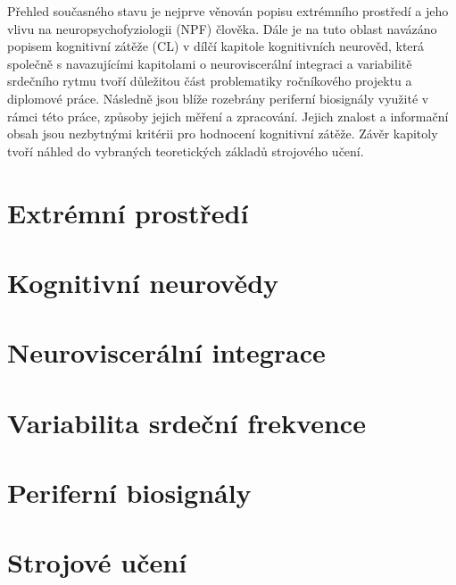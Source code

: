 Přehled současného stavu je nejprve věnován popisu extrémního prostředí a jeho
vlivu na neuropsychofyziologii (\gls{NPF}) člověka. Dále je na tuto oblast
navázáno popisem kognitivní zátěže (\gls{CL}) v dílčí kapitole kognitivních
neurověd, která společně s navazujícími kapitolami o neuroviscerální integraci a
variabilitě srdečního rytmu tvoří důležitou část problematiky ročníkového
projektu a diplomové práce. Následně jsou blíže rozebrány periferní biosignály
využité v rámci této práce, způsoby jejich měření a zpracování. Jejich znalost a
informační obsah jsou nezbytnými kritérii pro hodnocení kognitivní zátěže. Závěr
kapitoly tvoří náhled do vybraných teoretických základů strojového učení.

\section{Extrémní prostředí}
\label{sec:extreme_environment}


\section{Kognitivní neurovědy}
\label{sec:cognitive_neuroscience}


\section{Neuroviscerální integrace}
\label{sec:neurovisceralni_integrace}


\section{Variabilita srdeční frekvence}
\label{sec:hrv}


\section{Periferní biosignály}
\label{sec:peripheral_biosignals}


\section{Strojové učení}
\label{sec:machine_learning}
